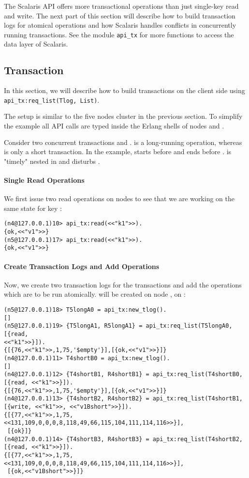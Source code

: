 The Scalaris API offers more transactional operations than just single-key read and write.
The next part of this section will describe how to build transaction logs for atomical
operations and how Scalaris handles conflicts in concurrently running transactions. See
the module \lstinline{api_tx} for more functions to access the data layer of Scalaris.

\subsection{Transaction}
In this section, we will describe how to build transactions on the client side using \lstinline{api_tx:req_list(Tlog, List)}.

The setup is similar to the five nodes cluster in the previous section.
To simplify the example all API calls are typed inside the Erlang shells of nodes 
and .

Consider two concurrent transactions  and .  is a long-running
operation, whereas  is only a short transaction.  In the example,  starts
before  and  ends before .  is "timely" nested in 
and disturbs .

\paragraph{Single Read Operations}
We first issue two read operations on nodes  to see that we are working on
the same state for key :

\begin{lstlisting}
(n4@127.0.0.1)10> api_tx:read(<<"k1">>).
{ok,<<"v1">>}
(n5@127.0.0.1)17> api_tx:read(<<"k1">>).
{ok,<<"v1">>}
\end{lstlisting}

\paragraph{Create Transaction Logs and Add Operations}
Now, we create two transaction logs for the transactions and add the operations which are
to be run atomically.  will be created on node ,  on :
\begin{lstlisting}
(n5@127.0.0.1)18> T5longA0 = api_tx:new_tlog().
[]
(n5@127.0.0.1)19> {T5longA1, R5longA1} = api_tx:req_list(T5longA0, [{read, 
<<"k1">>}]).
{[{76,<<"k1">>,1,75,'$empty'}],[{ok,<<"v1">>}]}
(n4@127.0.0.1)11> T4shortB0 = api_tx:new_tlog().
[]
(n4@127.0.0.1)12> {T4shortB1, R4shortB1} = api_tx:req_list(T4shortB0, 
[{read, <<"k1">>}]). 
{[{76,<<"k1">>,1,75,'$empty'}],[{ok,<<"v1">>}]}
(n4@127.0.0.1)13> {T4shortB2, R4shortB2} = api_tx:req_list(T4shortB1, 
[{write, <<"k1">>, <<"v1Bshort">>}]).
{[{77,<<"k1">>,1,75, <<131,109,0,0,0,8,118,49,66,115,104,111,114,116>>}],
 [{ok}]}
(n4@127.0.0.1)14> {T4shortB3, R4shortB3} = api_tx:req_list(T4shortB2, 
[{read, <<"k1">>}]).                 
{[{77,<<"k1">>,1,75, <<131,109,0,0,0,8,118,49,66,115,104,111,114,116>>}],
 [{ok,<<"v1Bshort">>}]}
\end{lstlisting}

